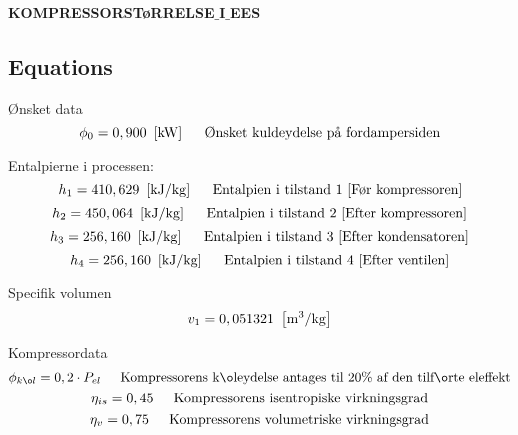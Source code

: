 \documentclass[Hovedrapport.tex]{article}
\newcommand{\I}{\mbox{\hspace{0.20in}}}
\begin{document}
\begin{center}
\bf \mbox{KOMPRESSORSTøRRELSE$\_$I$\_$EES}
\vspace{0.2 in}
\end{center}
\subsection*{Equations}

\vspace{0.10in}
\noindent
\rm Ønsket data
\begin{equation}
\label{EES Eqn:1}
\phi_{0} = 0,900  \   \left[ \rm kW \right]			 
\mbox{\I Ønsket kuldeydelse på fordampersiden}
\end{equation}

\vspace{0.10in}
\noindent
\rm Entalpierne i processen:
\begin{equation}
\label{EES Eqn:2}
h_{1} = 410,629   \   \left[ \rm kJ/kg \right] 			 
\mbox{\I Entalpien i tilstand 1 [Før kompressoren]}
\end{equation}
\begin{equation}
\label{EES Eqn:3}
h_{2} = 450,064   \   \left[ \rm kJ/kg \right]			 
\mbox{\I Entalpien i tilstand 2 [Efter kompressoren]}
\end{equation}
\begin{equation}
\label{EES Eqn:4}
h_{3} = 256,160   \   \left[ \rm kJ/kg \right]			 
\mbox{\I Entalpien i tilstand 3 [Efter kondensatoren]}
\end{equation}
\begin{equation}
\label{EES Eqn:5}
h_{4} = 256,160   \   \left[ \rm kJ/kg \right]			 
\mbox{\I Entalpien i tilstand 4 [Efter ventilen]}
\end{equation}

\vspace{0.10in}
\noindent
\rm Specifik volumen
\begin{equation}
\label{EES Eqn:6}
v_{1}=0,051321   \   \left[ \rm m^{3}/kg \right] 
\end{equation}
\rm

\vspace{0.10in}
\noindent
\rm Kompressordata
\begin{equation}
\label{EES Eqn:7}
\phi_{køl} = 0,2\cdot P_{el			} 
\mbox{\I Kompressorens køleydelse antages til 20\% af den tilførte eleffekt}
\end{equation}
\begin{equation}
\label{EES Eqn:8}
\eta_{is} = 0,45				 
\mbox{\I Kompressorens isentropiske virkningsgrad}
\end{equation}
\begin{equation}
\label{EES Eqn:9}
\eta_{v} = 0,75				 
\mbox{\I Kompressorens volumetriske virkningsgrad}
\end{equation}
\end{document}
